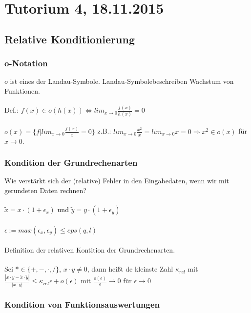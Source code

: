 \documentclass{llncs}
\begin{document}
\chapter*{Tutorium 4, 18.11.2015}

\section*{Relative Konditionierung}

\subsection*{o-Notation}

$o$ ist eines der Landau-Symbole. Landau-Symbolebeschreiben Wachstum von Funktionen.\\
\\
Def.: $f(x) \in o(h(x)) \Leftrightarrow lim_{x \rightarrow 0}\frac{f(x)}{h(x)} = 0$\\
\\
$o(x) = \{f | lim_{x \rightarrow 0} \frac{f(x)}{x} = 0\}$ z.B.: $lim_{x \rightarrow 0} \frac{x^2}{x} = lim_{x \rightarrow 0} x = 0 \Longrightarrow x^2 \in o(x)$ f\"ur $x \rightarrow 0$.

\subsection*{Kondition der Grundrechenarten}

Wie verst\"arkt sich der (relative) Fehler in den Eingabedaten, wenn wir mit gerundeten Daten rechnen?\\
\\
$\tilde{x} = x \cdot (1+ \epsilon_x)$ und $\tilde{y} = y \cdot (1+\epsilon_y)$\\
\\
$\epsilon := max(\epsilon_x, \epsilon_y) \leq eps(q,l)$\\
\\
Definition der relativen Kontition der Grundrechenarten.\\
\\
Sei $* \in \{+,-,\cdot, /\}$, $x \cdot y \neq 0$, dann hei\ss t de kleinste Zahl $\kappa_{rel}$ mit $\frac{|x \cdot y - \tilde{x} \cdot \tilde{y}|}{|x \cdot y|} \leq \kappa_{rel} \epsilon + o(\epsilon)$ mit $\frac{o(\epsilon)}{\epsilon} \rightarrow 0$ f\"ur $\epsilon \rightarrow 0$

\subsection*{Kondition von Funktionsauswertungen}
\end{document}

